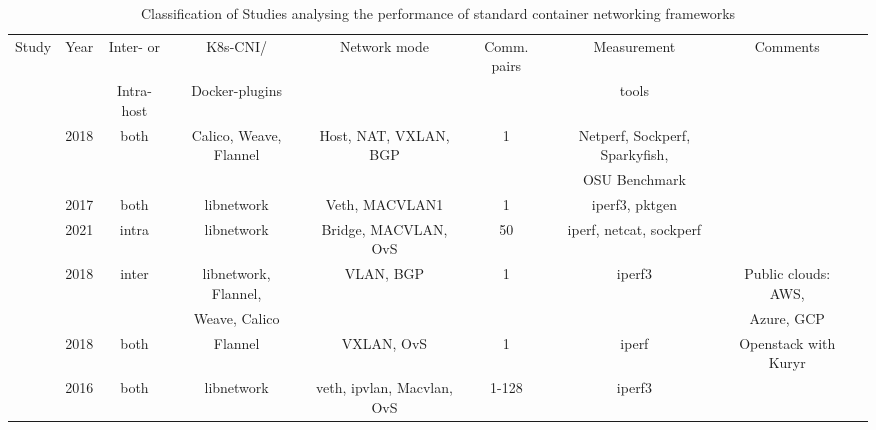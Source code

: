 \documentclass[conference]{IEEEtran}
\begin{document}
\begin{table}[t]

 \begin{center}

   \caption{ Classification of Studies analysing the performance of standard container networking frameworks}\label{tab:1}

   \begin{tabular}{c c c c c c c c c}
     \hline
     Study & Year & Inter- or & K8s-CNI/& Network mode & Comm. pairs & Measurement& Comments  \\ 
      &  & Intra-host & Docker-plugins & & & tools &   \\ 
     \hline
     \cite{IEEE_INFOCOM_2018:K. Suo} & 2018 & both & Calico, Weave, Flannel & Host, NAT, VXLAN, BGP & 1 & Netperf, Sockperf, Sparkyfish,& & \\
     & & & & & & OSU Benchmark & & \\     
     \cite{HotConNet_17:Zhao} & 2017 & both & libnetwork & Veth, MACVLAN1 & 1 & iperf3, pktgen & & \\
     \cite{Boeira:2021} & 2021 & intra & libnetwork & Bridge, MACVLAN, OvS & 50 & iperf, netcat, sockperf & &\\
     \cite{Bankston:2018} & 2018 & inter & libnetwork, Flannel, & VLAN, BGP & 1 & iperf3 & Public clouds: AWS,\\
      & & &Weave, Calico & & & & Azure, GCP \\
     \cite{ICTC_2018:Park} & 2018 & both & Flannel & VXLAN, OvS & 1 & iperf & Openstack with Kuryr\\
     \cite{NOMS_2016:Claassen} & 2016 & both & libnetwork & veth, ipvlan, Macvlan, OvS & 1-128 & iperf3 & &\\
     \hline 

   \end{tabular}

 \end{center}
\end{table} 
\end{document}
